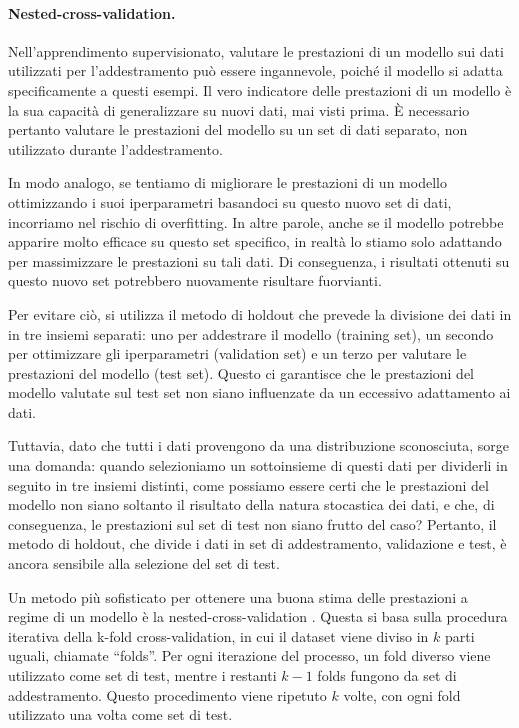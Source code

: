 \paragraph{Nested-cross-validation.} Nell'apprendimento supervisionato,
valutare le prestazioni di un modello sui dati utilizzati per l'addestramento
può essere ingannevole, poiché il modello si adatta specificamente a questi
esempi. Il vero indicatore delle prestazioni di un modello è la sua capacità
di generalizzare su nuovi dati, mai visti prima. È necessario pertanto
valutare le prestazioni del modello su un set di dati separato, non utilizzato
durante l'addestramento.

In modo analogo, se tentiamo di migliorare le prestazioni di un modello
ottimizzando i suoi iperparametri basandoci su questo nuovo set di dati,
incorriamo nel rischio di overfitting. In altre parole, anche se il modello
potrebbe apparire molto efficace su questo set specifico, in realtà lo stiamo
solo adattando per massimizzare le prestazioni su tali dati. Di conseguenza, i
risultati ottenuti su questo nuovo set potrebbero nuovamente risultare
fuorvianti.

Per evitare ciò, si utilizza il metodo di holdout che prevede la divisione dei
dati in in tre insiemi separati: uno per addestrare il modello (training set),
un secondo per ottimizzare gli iperparametri (validation set) e un terzo per
valutare le prestazioni del modello (test set). Questo ci garantisce che le
prestazioni del modello valutate sul test set non siano influenzate da un
eccessivo adattamento ai dati.

Tuttavia, dato che tutti i dati provengono da una distribuzione sconosciuta,
sorge una domanda: quando selezioniamo un sottoinsieme di questi dati per
dividerli in seguito in tre insiemi distinti, come possiamo essere certi che
le prestazioni del modello non siano soltanto il risultato della natura
stocastica dei dati, e che, di conseguenza, le prestazioni sul set di test non
siano frutto del caso? Pertanto, il metodo di holdout, che divide i dati in
set di addestramento, validazione e test, è ancora sensibile alla selezione
del set di test.

Un metodo più sofisticato per ottenere una buona stima delle prestazioni a
regime di un modello è la nested-cross-validation \cite{cawley2010}. Questa si
basa sulla procedura iterativa della k-fold cross-validation, in cui il
dataset viene diviso in $k$ parti uguali, chiamate ``folds''. Per ogni
iterazione del processo, un fold diverso viene utilizzato come set di test,
mentre i restanti $k-1$ folds fungono da set di addestramento. Questo
procedimento viene ripetuto $k$ volte, con ogni fold utilizzato una volta come
set di test.

